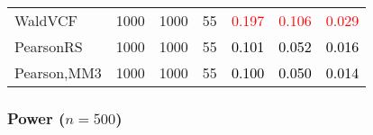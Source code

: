 \documentclass[
]{article}
\begin{document}
\begin{table}[H]
{\begin{tabular}[t]{lrrrrrr}
\hspace{1em}WaldVCF & 1000 & 1000 & 55 & \textcolor{red}{0.197} & \textcolor{red}{0.106} & \textcolor{red}{0.029}\\
\hspace{1em}PearsonRS & 1000 & 1000 & 55 & \textcolor{black}{0.101} & \textcolor{black}{0.052} & \textcolor{black}{0.016}\\
\hspace{1em}Pearson,MM3 & 1000 & 1000 & 55 & \textcolor{black}{0.100} & \textcolor{black}{0.050} & \textcolor{black}{0.014}\\
\bottomrule
\end{tabular}}
\endgroup{}
\end{table}

\hypertarget{power-n500-1}{%
\subsubsection{\texorpdfstring{Power
(\(n=500\))}{Power (n=500)}}\label{power-n500-1}}
\end{document}
